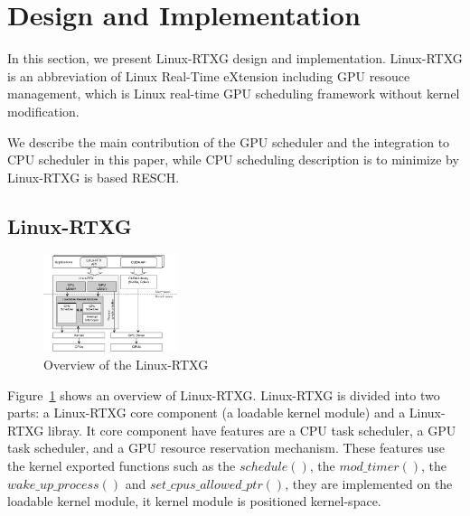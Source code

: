 \section{Design and Implementation}\label{sec:design_imple}
In this section, we present Linux-RTXG design and implementation.
Linux-RTXG is an abbreviation of Linux Real-Time eXtension including GPU resouce management,
which is Linux real-time GPU scheduling framework without kernel modification.

We describe the main contribution of the GPU scheduler and the integration to CPU scheduler in this paper,
while CPU scheduling description is to minimize by Linux-RTXG is based RESCH.


\subsection{Linux-RTXG}
\begin{figure}[t]
\begin{center}
\includegraphics[width=0.35\textwidth]{img/overview.pdf}
\caption{Overview of the Linux-RTXG}
\end{center}
\label{fig:overview}
\end{figure}

Figure~\ref{fig:overview} shows an overview of Linux-RTXG.
Linux-RTXG is divided into two parts: a Linux-RTXG core component (a loadable kernel module) and a Linux-RTXG libray.
It core component have features are a CPU task scheduler, a GPU task scheduler, and a GPU resource reservation mechanism.
These features use the kernel exported functions such as the $schedule()$, the $mod\_timer()$, the $wake\_up\_process()$ and $set\_cpus\_allowed\_ptr()$, they are implemented on the loadable kernel module, it kernel module is positioned kernel-space. 

